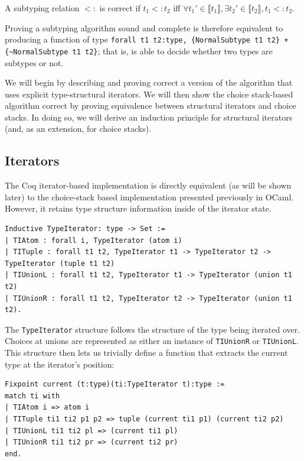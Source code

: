 \documentclass[a4paper,english]{lipics-v2019}
\newcommand{\denotes}[1]{\llbracket #1 \rrbracket}
\begin{document}
\begin{definition}
A subtyping relation $<:$ is correct if $t_1 <: t_2$ iff $\forall t_1' \in \denotes{t_1},
\exists t_2' \in \denotes{t_2}, t_1 <: t_2$.
\label{dfn:scr}
\end{definition}

Proving a subtyping algorithm sound and complete is therefore equivalent to
producing a function of type \verb|forall t1 t2:type, {NormalSubtype t1 t2} + {~NormalSubtype t1 t2}|; that is, is able to decide whether two types are
subtypes or not.

We will begin by describing and proving correct a version of the algorithm
that uses explicit type-structural iterators. We will then show the choice
stack-based algorithm correct by proving equivalence between structural
iterators and choice stacks. In doing so, we will derive an induction
principle for structural iterators (and, as an extension, for choice stacks).

\subsection{Iterators}

The Coq iterator-based implementation is directly equivalent (as will be shown
later) to the choice-stack based implementation presented previously in OCaml.
However, it retains type structure information inside of the iterator state.

\begin{small}\begin{verbatim}
Inductive TypeIterator: type -> Set :=
| TIAtom : forall i, TypeIterator (atom i)
| TITuple : forall t1 t2, TypeIterator t1 -> TypeIterator t2 -> TypeIterator (tuple t1 t2)
| TIUnionL : forall t1 t2, TypeIterator t1 -> TypeIterator (union t1 t2)
| TIUnionR : forall t1 t2, TypeIterator t2 -> TypeIterator (union t1 t2).
\end{verbatim}\end{small}

The \verb|TypeIterator| structure follows the structure of the type being
iterated over. Choices at unions are represented as either an instance of
\verb|TIUnionR| or \verb|TIUnionL|. This structure then lets us trivially
define a function that extracts the current type at the iterator's position:

\begin{small}\begin{verbatim}
Fixpoint current (t:type)(ti:TypeIterator t):type :=
match ti with
| TIAtom i => atom i
| TITuple ti1 ti2 p1 p2 => tuple (current ti1 p1) (current ti2 p2)
| TIUnionL ti1 ti2 pl => (current ti1 pl)
| TIUnionR ti1 ti2 pr => (current ti2 pr)
end.
\end{verbatim}
\end{small}
\end{document}
